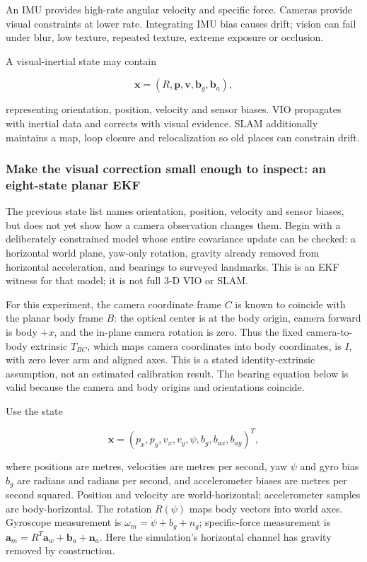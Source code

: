 An IMU provides high-rate angular velocity and specific force. Cameras provide visual constraints at lower rate. Integrating IMU bias causes drift; vision can fail under blur, low texture, repeated texture, extreme exposure or occlusion.

A visual-inertial state may contain

\[
\mathbf{x}=(R,\mathbf{p},\mathbf{v},\mathbf{b}_g,\mathbf{b}_a),
\]

representing orientation, position, velocity and sensor biases. VIO propagates with inertial data and corrects with visual evidence. SLAM additionally maintains a map, loop closure and relocalization so old places can constrain drift.

\subsubsection{Make the visual correction small enough to inspect: an eight-state planar EKF}\label{04-visual-computing-ii-ch035-make-the-visual-correction-small-enough-to-inspect-an-eight-state-planar-ekf}

The previous state list names orientation, position, velocity and sensor biases, but does not yet show how a camera observation changes them. Begin with a deliberately constrained model whose entire covariance update can be checked: a horizontal world plane, yaw-only rotation, gravity already removed from horizontal acceleration, and bearings to surveyed landmarks. This is an EKF witness for that model; it is not full 3-D VIO or SLAM.

For this experiment, the camera coordinate frame \(C\) is known to coincide with the planar body frame \(B\): the optical center is at the body origin, camera forward is body \(+x\), and the in-plane camera rotation is zero. Thus the fixed camera-to-body extrinsic \(T_{BC}\), which maps camera coordinates into body coordinates, is \(I\), with zero lever arm and aligned axes. This is a stated identity-extrinsic assumption, not an estimated calibration result. The bearing equation below is valid because the camera and body origins and orientations coincide.

Use the state

\[
\mathbf{x}=(p_x,p_y,v_x,v_y,\psi,b_g,b_{ax},b_{ay})^T,
\]

where positions are metres, velocities are metres per second, yaw \(\psi\) and gyro bias \(b_g\) are radians and radians per second, and accelerometer biases are metres per second squared. Position and velocity are world-horizontal; accelerometer samples are body-horizontal. The rotation \(R(\psi)\) maps body vectors into world axes. Gyroscope measurement is \(\omega_m=\dot\psi+b_g+n_g\); specific-force measurement is \(\mathbf{a}_m=R^T\mathbf{a}_w+\mathbf{b}_a+\mathbf{n}_a\). Here the simulation's horizontal channel has gravity removed by construction.

